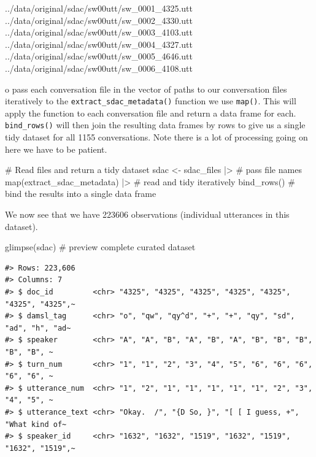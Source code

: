 \documentclass[
  letterpaper,
]{latex/krantz}
\newenvironment{Shaded}{\begin{snugshade}}{\end{snugshade}}
\newcommand{\CommentTok}[1]{\textcolor[rgb]{0.37,0.37,0.37}{#1}}
\newcommand{\FunctionTok}[1]{\textcolor[rgb]{0.28,0.35,0.67}{#1}}
\newcommand{\NormalTok}[1]{\textcolor[rgb]{0.00,0.23,0.31}{#1}}
\newcommand{\OtherTok}[1]{\textcolor[rgb]{0.00,0.23,0.31}{#1}}
\newcommand{\SpecialCharTok}[1]{\textcolor[rgb]{0.37,0.37,0.37}{#1}}
\begin{document}
\begin{Shaded}
\begin{Highlighting}[]
\NormalTok{../data/original/sdac/sw00utt/sw\_0001\_4325.utt}
\NormalTok{../data/original/sdac/sw00utt/sw\_0002\_4330.utt}
\NormalTok{../data/original/sdac/sw00utt/sw\_0003\_4103.utt}
\NormalTok{../data/original/sdac/sw00utt/sw\_0004\_4327.utt}
\NormalTok{../data/original/sdac/sw00utt/sw\_0005\_4646.utt}
\NormalTok{../data/original/sdac/sw00utt/sw\_0006\_4108.utt}
\end{Highlighting}
\end{Shaded}

o pass each conversation file in the vector of paths to our conversation
files iteratively to the \texttt{extract\_sdac\_metadata()} function we
use \texttt{map()}. This will apply the function to each conversation
file and return a data frame for each. \texttt{bind\_rows()} will then
join the resulting data frames by rows to give us a single tidy dataset
for all 1155 conversations. Note there is a lot of processing going on
here we have to be patient.

\begin{Shaded}
\begin{Highlighting}[]
\CommentTok{\# Read files and return a tidy dataset}
\NormalTok{sdac }\OtherTok{\textless{}{-}} 
\NormalTok{  sdac\_files }\SpecialCharTok{|\textgreater{}} \CommentTok{\# pass file names}
  \FunctionTok{map}\NormalTok{(extract\_sdac\_metadata) }\SpecialCharTok{|\textgreater{}} \CommentTok{\# read and tidy iteratively }
  \FunctionTok{bind\_rows}\NormalTok{() }\CommentTok{\# bind the results into a single data frame}
\end{Highlighting}
\end{Shaded}

We now see that we have 223606 observations (individual utterances in
this dataset).

\begin{Shaded}
\begin{Highlighting}[]
\FunctionTok{glimpse}\NormalTok{(sdac) }\CommentTok{\# preview complete curated dataset}
\end{Highlighting}
\end{Shaded}

\begin{verbatim}
#> Rows: 223,606
#> Columns: 7
#> $ doc_id         <chr> "4325", "4325", "4325", "4325", "4325", "4325", "4325",~
#> $ damsl_tag      <chr> "o", "qw", "qy^d", "+", "+", "qy", "sd", "ad", "h", "ad~
#> $ speaker        <chr> "A", "A", "B", "A", "B", "A", "B", "B", "B", "B", "B", ~
#> $ turn_num       <chr> "1", "1", "2", "3", "4", "5", "6", "6", "6", "6", "6", ~
#> $ utterance_num  <chr> "1", "2", "1", "1", "1", "1", "1", "2", "3", "4", "5", ~
#> $ utterance_text <chr> "Okay.  /", "{D So, }", "[ [ I guess, +", "What kind of~
#> $ speaker_id     <chr> "1632", "1632", "1519", "1632", "1519", "1632", "1519",~
\end{verbatim}
\end{document}
